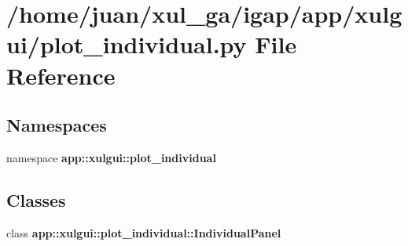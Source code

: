 \section{/home/juan/xul\_\-ga/igap/app/xulgui/plot\_\-individual.py File Reference}
\label{plot__individual_8py}
\subsection*{Namespaces}
\begin{CompactItemize}
\item 
namespace {\bf app::xulgui::plot\_\-individual}
\end{CompactItemize}
\subsection*{Classes}
\begin{CompactItemize}
\item 
class {\bf app::xulgui::plot\_\-individual::IndividualPanel}
\end{CompactItemize}

